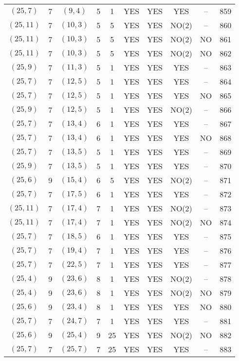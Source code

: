 \begin{longtable}{|c|c|c|c|c|c|c|c|c|c|}
$(25, 7)$ & 7 & $(9, 4)$ & 5 & 1 & YES & YES & YES & -- & 859\\
$(25, 11)$ & 7 & $(10, 3)$ & 5 & 5 & YES & YES & NO(2) & -- & 860\\
$(25, 11)$ & 7 & $(10, 3)$ & 5 & 5 & YES & YES & NO(2) & NO & 861\\
$(25, 11)$ & 7 & $(10, 3)$ & 5 & 5 & YES & YES & NO(2) & NO & 862\\
$(25, 9)$ & 7 & $(11, 3)$ & 5 & 1 & YES & YES & YES & -- & 863\\
$(25, 7)$ & 7 & $(12, 5)$ & 5 & 1 & YES & YES & YES & -- & 864\\
$(25, 7)$ & 7 & $(12, 5)$ & 5 & 1 & YES & YES & YES & NO & 865\\
$(25, 9)$ & 7 & $(12, 5)$ & 5 & 1 & YES & YES & NO(2) & -- & 866\\
$(25, 7)$ & 7 & $(13, 4)$ & 6 & 1 & YES & YES & YES & -- & 867\\
$(25, 7)$ & 7 & $(13, 4)$ & 6 & 1 & YES & YES & YES & NO & 868\\
$(25, 7)$ & 7 & $(13, 5)$ & 5 & 1 & YES & YES & YES & -- & 869\\
$(25, 9)$ & 7 & $(13, 5)$ & 5 & 1 & YES & YES & YES & -- & 870\\
$(25, 6)$ & 9 & $(15, 4)$ & 6 & 5 & YES & YES & NO(2) & -- & 871\\
$(25, 7)$ & 7 & $(17, 5)$ & 6 & 1 & YES & YES & YES & -- & 872\\
$(25, 11)$ & 7 & $(17, 4)$ & 7 & 1 & YES & YES & NO(2) & -- & 873\\
$(25, 11)$ & 7 & $(17, 4)$ & 7 & 1 & YES & YES & NO(2) & NO & 874\\
$(25, 7)$ & 7 & $(18, 5)$ & 6 & 1 & YES & YES & YES & -- & 875\\
$(25, 7)$ & 7 & $(19, 4)$ & 7 & 1 & YES & YES & YES & -- & 876\\
$(25, 7)$ & 7 & $(22, 5)$ & 7 & 1 & YES & YES & YES & -- & 877\\
$(25, 4)$ & 9 & $(23, 6)$ & 8 & 1 & YES & YES & NO(2) & -- & 878\\
$(25, 4)$ & 9 & $(23, 6)$ & 8 & 1 & YES & YES & NO(2) & NO & 879\\
$(25, 6)$ & 9 & $(23, 4)$ & 8 & 1 & YES & YES & YES & NO & 880\\
$(25, 7)$ & 7 & $(24, 7)$ & 7 & 1 & YES & YES & YES & -- & 881\\
$(25, 6)$ & 9 & $(25, 4)$ & 9 & 25 & YES & YES & NO(2) & NO & 882\\
$(25, 7)$ & 7 & $(25, 7)$ & 7 & 25 & YES & YES & YES & -- & 883\\

\end{longtable}
